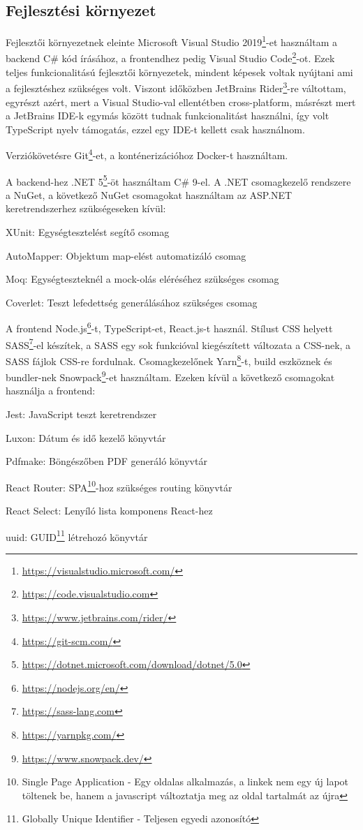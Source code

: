 \subsection{Fejlesztési környezet}

Fejlesztői környezetnek eleinte Microsoft Visual Studio 2019\footnote{\url{https://visualstudio.microsoft.com/}}-et használtam a backend C\# kód írásához, a frontendhez pedig Visual Studio Code\footnote{\url{https://code.visualstudio.com}}-ot. Ezek teljes funkcionalitású fejlesztői környezetek, mindent képesek voltak nyújtani ami a fejlesztéshez szükséges volt. Viszont időközben JetBrains Rider\footnote{\url{https://www.jetbrains.com/rider/}}-re váltottam, egyrészt azért, mert a Visual Studio-val ellentétben cross-platform, másrészt mert a JetBrains IDE-k egymás között tudnak funkcionalitást használni, így volt TypeScript nyelv támogatás, ezzel egy IDE-t kellett csak használnom.

Verziókövetésre Git\footnote{\url{https://git-scm.com/}}-et, a konténerizációhoz Docker-t használtam.

A backend-hez .NET 5\footnote{\url{https://dotnet.microsoft.com/download/dotnet/5.0}}-öt használtam C\# 9-el. A .NET csomagkezelő rendszere a NuGet, a következő NuGet csomagokat használtam az ASP.NET keretrendszerhez szükségeseken kívül:

\begin{compactitem}
	\item XUnit: Egységtesztelést segítő csomag
	\item AutoMapper: Objektum map-elést automatizáló csomag
	\item Moq: Egységteszteknél a mock-olás eléréséhez szükséges csomag
	\item Coverlet: Teszt lefedettség generálásához szükséges csomag
\end{compactitem}

A frontend Node.js\footnote{\url{https://nodejs.org/en/}}-t, TypeScript-et, React.js-t használ. Stílust CSS helyett SASS\footnote{\url{https://sass-lang.com}}-el készítek, a SASS egy sok funkcióval kiegészített változata a CSS-nek, a SASS fájlok CSS-re fordulnak. Csomagkezelőnek Yarn\footnote{\url{https://yarnpkg.com/}}-t, build eszköznek és bundler-nek Snowpack\footnote{\url{https://www.snowpack.dev/}}-et használtam. Ezeken kívül a következő csomagokat használja a frontend:

\begin{compactitem}
	\item Jest: JavaScript teszt keretrendszer
	\item Luxon: Dátum és idő kezelő könyvtár
	\item Pdfmake: Böngészőben PDF generáló könyvtár
	\item React Router: SPA\footnote{Single Page Application - Egy oldalas alkalmazás, a linkek nem egy új lapot töltenek be, hanem a javascript változtatja meg az oldal tartalmát az újra}-hoz szükséges routing könyvtár
	\item React Select: Lenyíló lista komponens React-hez
	\item uuid: GUID\footnote{Globally Unique Identifier - Teljesen egyedi azonosító} létrehozó könyvtár
\end{compactitem}

